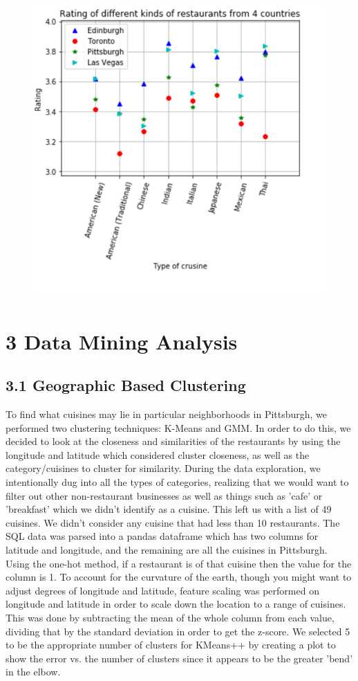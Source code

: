 \documentclass{neu_handout}
\begin{document}
\begin{figure}[h]
\centering
{
\includegraphics[width=0.4\linewidth]{Rating_different_restaurants_countries}
}
\end{figure}

\section*{3 Data Mining Analysis}

\subsection*{3.1 Geographic Based Clustering}
To find what cuisines may lie in particular neighborhoods in Pittsburgh, we performed two clustering techniques: K-Means and GMM. In order to do this, we decided to look at the closeness and similarities of the restaurants by using the longitude and latitude which considered cluster closeness, as well as the category/cuisines to cluster for similarity. During the data exploration, we intentionally dug into all the types of categories, realizing that we would want to filter out other non-restaurant businesses as well as things such as 'cafe' or 'breakfast' which we didn't identify as a cuisine. This left us with a list of 49 cuisines. We didn't consider any cuisine that had less than 10 restaurants. The SQL data was parsed into a pandas dataframe which has two columns for latitude and longitude, and the remaining are all the cuisines in Pittsburgh. Using the one-hot method, if a restaurant is of that cuisine then the value for the column is 1. To account for the curvature of the earth, though you might want to adjust degrees of longitude and latitude, feature scaling was performed on longitude and latitude in order to scale down the location to a range of cuisines. This was done by subtracting the mean of the whole column from each value, dividing that by the standard deviation in order to get the z-score. We selected 5 to be the appropriate number of clusters for KMeans++ by creating a plot to show the error vs. the number of clusters since it appears to be the greater 'bend' in the elbow.
\end{document}
